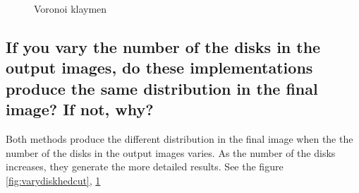 \documentclass[11pt]{article}
\begin{document}
	\begin{figure}[ht] 
	\begin{center} 
	\caption{Voronoi klaymen} 
	\label{fig:varydiskvoronoi}
	\end{center} 
	\end{figure}


\subsection{If you vary the number of the disks in the output images, do these implementations produce the same distribution in the final image? If not, why?}%
Both methods produce the different distribution in the final image when the the number of the disks in the output images varies. As the number of the disks increases, they generate the more detailed results. See the figure \ref{fig:varydiskhedcut}, \ref{fig:varydiskvoronoi}
\end{document}
